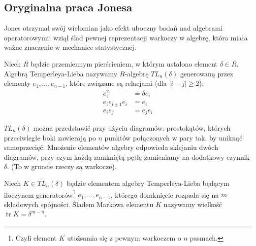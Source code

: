 \subsection{Oryginalna praca Jonesa} %
\label{sub:jones_paper}
Jones otrzymał swój wielomian jako efekt uboczny badań nad algebrami operatorowymi: wziął ślad pewnej reprezentacji warkoczy w algebrę, która miała ważne znaczenie w mechanice statystycznej.


\begin{definition}
	Niech $R$ będzie przemiennym pierścieniem, w którym ustalono element $\delta \in R$.
	Algebrą Temperleya-Lieba nazywamy $R$-algebrę $TL_n(\delta)$ generowaną przez elementy $e_1, \ldots, e_{n-1}$, które związane są relacjami (dla $|i-j| \ge 2$):
	\begin{align*}
		e_i^2 & = \delta e_i \\
		e_i e_{i \pm 1} e_i & = e_i \\
		e_i e_j & = e_j e_i
	\end{align*}
\end{definition}

$TL_n(\delta)$ można przedstawić przy użyciu diagramów: prostokątów, których przeciwległe boki zawierają po $n$ punktów połączonych w pary tak, by uniknąć samoprzecięć. Mnożenie elementów algebry odpowieda sklejaniu dwóch diagramów, przy czym każdą zamkniętą pętlę zamieniamy na dodatkowy czynnik $\delta$.
(To w gruncie rzeczy są warkocze).

\begin{definition}
	Niech $K \in TL_n(\delta)$ będzie elementem algebry Temperleya-Lieba będącym iloczynem generatorów\footnote{Czyli element $K$ utożsamia się z pewnym warkoczem o $n$ pasmach.} $e_1, \ldots, e_{n-1}$, którego domknięcie rozpada się na $m$ składowych spójności.
	Śladem Markowa elementu $K$ nazywamy wielkość $\operatorname{tr} K = \delta^{m-n}$.
\end{definition}

